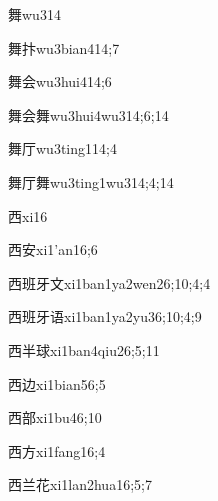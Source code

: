 \begin{verbete}{舞}{wu3}{14}
\end{verbete}
\begin{verbete}{舞抃}{wu3bian4}{14;7}
\end{verbete}
\begin{verbete}{舞会}{wu3hui4}{14;6}
\end{verbete}
\begin{verbete}{舞会舞}{wu3hui4wu3}{14;6;14}
\end{verbete}
\begin{verbete}{舞厅}{wu3ting1}{14;4}
\end{verbete}
\begin{verbete}{舞厅舞}{wu3ting1wu3}{14;4;14}
\end{verbete}
\begin{verbete}{西}{xi1}{6}
\end{verbete}
\begin{verbete}{西安}{xi1'an1}{6;6}
\end{verbete}
\begin{verbete}{西班牙文}{xi1ban1ya2wen2}{6;10;4;4}
\end{verbete}
\begin{verbete}{西班牙语}{xi1ban1ya2yu3}{6;10;4;9}
\end{verbete}
\begin{verbete}{西半球}{xi1ban4qiu2}{6;5;11}
\end{verbete}
\begin{verbete}{西边}{xi1bian5}{6;5}
\end{verbete}
\begin{verbete}{西部}{xi1bu4}{6;10}
\end{verbete}
\begin{verbete}{西方}{xi1fang1}{6;4}
\end{verbete}
\begin{verbete}{西兰花}{xi1lan2hua1}{6;5;7}
\end{verbete}
